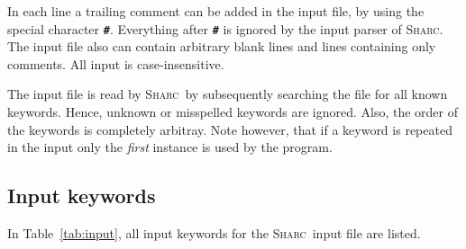 \documentclass[a4paper,11pt,DIV=15,openany,twoside=false]{scrbook}
\newcommand{\sharc}{\textsc{Sharc}}
\newcommand{\ttt}[1]{\textbf{\texttt{#1}}}
\begin{document}
In each line a trailing comment can be added in the input file, by using the special character \ttt{\#}. Everything after \ttt{\#} is ignored by the input parser of \sharc. The input file also can contain arbitrary blank lines and lines containing only comments. All input is case-insensitive.

The input file is read by \sharc\ by subsequently searching the file for all known keywords. Hence, unknown or misspelled keywords are ignored. Also, the order of the keywords is completely arbitray. Note however, that if a keyword is repeated in the input only the \textit{first} instance is used by the program. 

\subsection{Input keywords}

In Table~\ref{tab:input}, all input keywords for the \sharc\ input file are listed.
\end{document}
